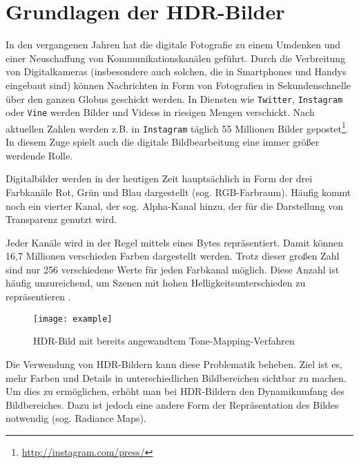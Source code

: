 
\chapter{Grundlagen der HDR-Bilder}
\label{chap:hdr}


In den vergangenen Jahren hat die digitale Fotografie zu einem Umdenken und einer Neuschaffung von Kommunikationskanälen geführt. 
Durch die Verbreitung von Digitalkameras (insbesondere auch solchen, die in Smartphones und Handys eingebaut sind) können Nachrichten in Form von Fotografien in Sekundenschnelle über den ganzen Globus geschickt werden. In Diensten wie \texttt{Twitter}, \texttt{Instagram} oder \texttt{Vine} werden Bilder und Videos in riesigen Mengen verschickt. Nach aktuellen Zahlen werden z.B. in \texttt{Instagram} täglich 55 Millionen Bilder gepostet\footnote{\url{http://instagram.com/press/}}. In diesem Zuge spielt auch die digitale Bildbearbeitung eine immer größer werdende Rolle. 

Digitalbilder werden in der heutigen Zeit hauptsächlich in Form der drei Farbkanäle Rot, Grün und Blau dargestellt (sog. RGB-Farbraum). Häufig kommt noch ein vierter Kanal, der sog. Alpha-Kanal hinzu, der für die Darstellung von Transparenz genutzt wird. 

Jeder Kanäle wird in der Regel mittels eines Bytes repräsentiert. Damit können 16,7 Millionen verschieden Farben dargestellt werden. Trotz dieser großen Zahl sind nur 256 verschiedene Werte für jeden Farbkanal möglich. Diese Anzahl ist häufig unzureichend, um Szenen mit hohen Helligkeitsunterschieden zu repräsentieren \cite[S.~1f]{Reinhard}.


\begin{figure}
  \begin{center}
    \texttt{[image: example]}
    \caption{HDR-Bild mit bereits angewandtem \gls{Tone-Mapping}-Verfahren \cite{tellone}}
    \label{fig:teezer}
  \end{center}
\end{figure}

Die Verwendung von \gls{HDR}-Bildern kann diese Problematik beheben. Ziel ist es, mehr Farben und Details in unterschiedlichen Bildbereichen sichtbar zu machen. Um dies zu ermöglichen, erhöht man bei \gls{HDR}-Bildern den \gls{Dynamikumfang} des Bildbereiches. Dazu ist jedoch eine andere Form der Repräsentation des Bildes notwendig (sog. \glspl{Radiance Map}).

